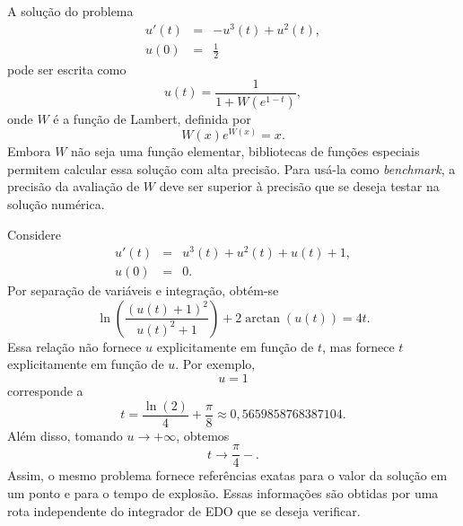 \begin{ex}
A solução do problema
\begin{eqnarray}
u'(t)&=&-u^3(t)+u^2(t),\\
u(0)&=&\frac{1}{2}
\end{eqnarray}
pode ser escrita como
\begin{equation}
u(t)=\frac{1}{1+W(e^{1-t})},
\end{equation}
onde $W$ é a função de Lambert, definida por
\begin{equation}
W(x)e^{W(x)}=x.
\end{equation}
Embora $W$ não seja uma função elementar, bibliotecas de funções especiais permitem calcular essa solução com alta precisão. Para usá-la como {\it benchmark}, a precisão da avaliação de $W$ deve ser superior à precisão que se deseja testar na solução numérica.
\end{ex}

\begin{ex}
Considere
\begin{eqnarray}
u'(t)&=&u^3(t)+u^2(t)+u(t)+1,\\
u(0)&=&0.
\end{eqnarray}
Por separação de variáveis e integração, obtém-se
\begin{equation}
\ln\left(\frac{(u(t)+1)^2}{u(t)^2+1}\right)+2\arctan(u(t))=4t.
\end{equation}
Essa relação não fornece $u$ explicitamente em função de $t$, mas fornece $t$ explicitamente em função de $u$. Por exemplo,
\begin{equation}
u=1
\end{equation}
corresponde a
\begin{equation}
t=\frac{\ln(2)}{4}+\frac{\pi}{8}\approx0,5659858768387104.
\end{equation}
Além disso, tomando $u\to+\infty$, obtemos
\begin{equation}
t\to\frac{\pi}{4}-.
\end{equation}
Assim, o mesmo problema fornece referências exatas para o valor da solução em um ponto e para o tempo de explosão. Essas informações são obtidas por uma rota independente do integrador de EDO que se deseja verificar.
\end{ex}


